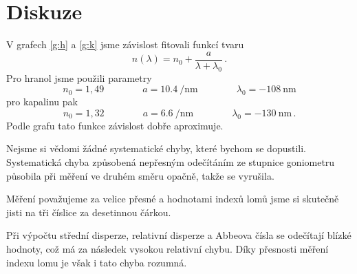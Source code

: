 \section*{Diskuze}
V grafech \ref{g:h} a \ref{g:k} jsme závislost fitovali funkcí tvaru \cite{skripta}
\begin{equation*}
n(\lambda) = n_0 + \frac{a}{\lambda + \lambda_0} \,.
\end{equation*}
Pro hranol jsme použili parametry
\begin{equation*}
n_0=1,49 \qquad \qquad a=\SI{10.4}{\per\nm} \qquad \qquad \lambda_0=\SI{-108}{\nm}
\end{equation*}
pro kapalinu pak
\begin{equation*}
n_0=1,32 \qquad \qquad a=\SI{6.6}{\per\nm} \qquad \qquad \lambda_0=\SI{-130}{\nm} \,.
\end{equation*}
Podle grafu tato funkce závislost dobře aproximuje.


Nejsme si vědomi žádné systematické chyby, které bychom se dopustili. Systematická chyba způsobená nepřesným odečítáním ze stupnice goniometru působila při měření ve druhém směru opačně, takže se vyrušila.

Měření považujeme za velice přesné a hodnotami indexů lomů jsme si skutečně jisti na tři číslice za desetinnou čárkou.

Při výpočtu střední disperze, relativní disperze a Abbeova čísla se odečítají blízké hodnoty, což má za následek vysokou relativní chybu. Díky přesnosti měření indexu lomu je však i tato chyba rozumná.

